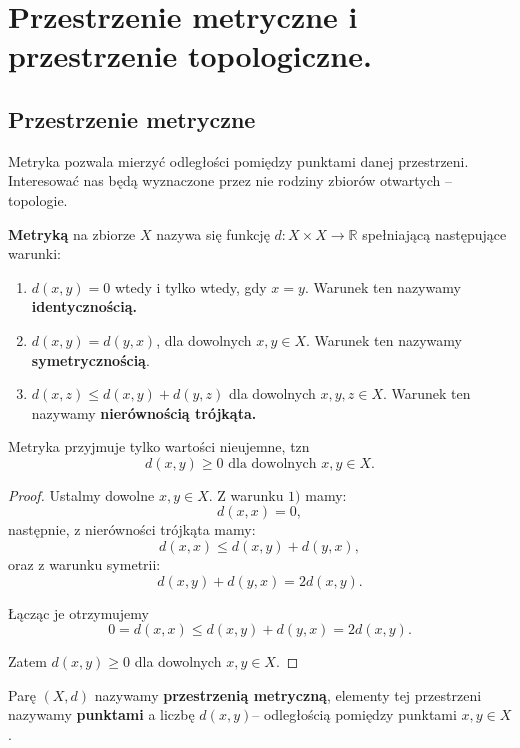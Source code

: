 \chapter{Przestrzenie metryczne i przestrzenie topologiczne.}

\section{Przestrzenie metryczne}
Metryka pozwala mierzyć odległości pomiędzy punktami danej przestrzeni. Interesować nas będą wyznaczone przez nie rodziny zbiorów otwartych -- topologie.

\begin{definition}[Metryka]
	\textbf{Metryką} na zbiorze $X$ nazywa się funkcję $d: X\times X \to \mathbb{R}$ spełniającą następujące warunki:
	\begin{enumerate}[label=\arabic*)]
		\item $d\left( x,y \right) = 0$ wtedy i tylko wtedy, gdy $x = y$. Warunek ten nazywamy \textbf{identycznością.} 
		\item $d\left( x,y \right) = d\left( y,x \right) $, dla dowolnych $x,y \in X$. Warunek ten nazywamy \textbf{symetrycznością}. 
		\item $d\left( x,z \right) \le d\left( x,y \right) + d\left( y,z \right) $ dla dowolnych $x,y,z \in X$. Warunek ten nazywamy \textbf{nierównością trójkąta.} 
	\end{enumerate}
\end{definition} 

\begin{fact}

	Metryka przyjmuje tylko wartości nieujemne, tzn
	 \[
	d\left( x,y \right) \ge 0\text{ dla dowolnych } x,y \in X
	.\] 
\end{fact}
\begin{proof}
	Ustalmy dowolne $x,y \in X$. Z warunku $1)$ mamy:
	 \[
	d\left( x,x \right) = 0
	,\] 
	następnie, z nierówności trójkąta mamy:
	\[
	d \left( x,x \right) \le d\left( x,y \right) + d\left( y,x \right) 
	,\]
	oraz z warunku symetrii:
	\[
	d\left( x,y  \right) + d\left( y,x \right) = 2d\left( x,y \right)  
	.\] 

	Łącząc je otrzymujemy
	\[
	0 = d \left( x,x \right) \le d\left( x,y \right) + d\left( y,x \right) = 2 d\left( x,y \right)  
	.\] 

	Zatem $d\left( x,y \right) \ge 0$ dla dowolnych $x,y \in X$.
\end{proof} 

Parę $\left( X,d \right) $ nazywamy \textbf{przestrzenią metryczną}, elementy tej przestrzeni nazywamy \textbf{punktami} a liczbę $d\left( x,y \right) $-- odległością pomiędzy punktami $x,y \in X$.

